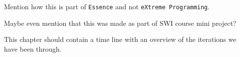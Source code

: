 Mention how this is part of \texttt{Essence} and not \texttt{eXtreme Programming}.

Maybe even mention that this was made as part of SWI course mini project?

This chapter should contain a time line with an overview of the iterations we have been through.